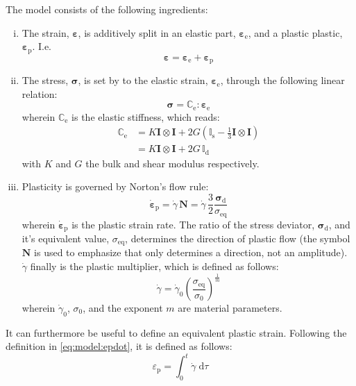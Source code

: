 \documentclass[times,namecite]{goose-article}
\begin{document}
The model consists of the following ingredients:
%
\begin{enumerate}[(i)]
%
\item The strain, $\bm{\varepsilon}$, is additively split in an elastic part, $\bm{\varepsilon}_\mathrm{e}$, and a plastic plastic, $\bm{\varepsilon}_\mathrm{p}$. I.e.
\begin{equation}
  \bm{\varepsilon}
  = \bm{\varepsilon}_\mathrm{e}
  + \bm{\varepsilon}_\mathrm{p}
\end{equation}
%
\item The stress, $\bm{\sigma}$, is set by to the elastic strain, $\bm{\varepsilon}_\mathrm{e}$, through the following linear relation:
\begin{equation}\label{eq:model:stress-elas}
  \bm{\sigma}
  = \mathbb{C}_\mathrm{e} : \bm{\varepsilon}_\mathrm{e}
\end{equation}
wherein $\mathbb{C}_\mathrm{e}$ is the elastic stiffness, which reads:
\begin{align}\label{eq:model:elas}
  \mathbb{C}_\mathrm{e}
  &= K \bm{I} \otimes \bm{I}
   + 2 G (\mathbb{I}_\mathrm{s} - \tfrac{1}{3} \bm{I} \otimes \bm{I} )
  \\
  &= K \bm{I} \otimes \bm{I}
  + 2 G \, \mathbb{I}_\mathrm{d}
\end{align}
with $K$ and $G$ the bulk and shear modulus respectively.
%
\item Plasticity is governed by Norton's flow rule:
\begin{equation}\label{eq:model:epdot}
  \dot{\bm{\varepsilon}}_\mathrm{p}
  = \dot{\gamma} \, \bm{N}
  = \dot{\gamma} \, \frac{3}{2} \frac{\bm{\sigma}_\mathrm{d}}{\sigma_\mathrm{eq}}
\end{equation}
wherein $\dot{\bm{\varepsilon}}_\mathrm{p}$ is the plastic strain rate. The ratio of the stress deviator, $\bm{\sigma}_\mathrm{d}$, and it's equivalent value, $\sigma_\mathrm{eq}$, determines the direction of plastic flow (the symbol $\bm{N}$ is used to emphasize that only determines a direction, not an amplitude). $\dot{\gamma}$ finally is the plastic multiplier, which is defined as follows:
\begin{equation}\label{eq:model:gammadot}
  \dot{\gamma}
  =
  \dot{\gamma}_0 \left( \frac{\sigma_\mathrm{eq}}{\sigma_0} \right)^{\frac{1}{m}}
\end{equation}
wherein $\dot{\gamma}_0$, $\sigma_0$, and the exponent $m$ are material parameters.
%
\end{enumerate}

It can furthermore be useful to define an equivalent plastic strain. Following the definition in \eqref{eq:model:epdot}, it is defined as follows:
\begin{equation}
  \varepsilon_\mathrm{p} = \int_0^t \dot{\gamma} \; \mathrm{d}\tau
\end{equation}
\end{document}
